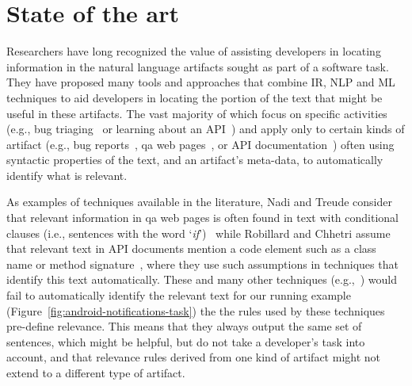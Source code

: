 \section{State of the art}
\label{cp1:novelty}


Researchers have long recognized the value of 
assisting developers in locating information in the natural language artifacts sought as part of a software task.
They have proposed many tools and approaches 
that combine \acf{IR}, \acf{NLP} and \acf{ML} techniques 
to aid developers in locating the portion of the text that
might be useful in these artifacts.
The vast majority of which focus on specific activities
(e.g., bug triaging~\cite{Chaparro2017} or learning about an API~\cite{Jiang2017}) and apply 
only to certain kinds of artifact 
(e.g., bug reports~\cite{Rastkar2010, Lotufo2012}, \acs{qa} web pages~\cite{Xu2017, silva2019}, or API documentation~\cite{fucci2019})
often using 
syntactic properties of the text, and an artifact's meta-data, to automatically identify what is relevant.



As examples of techniques available in the literature, Nadi and Treude consider 
that relevant information in \acs{qa} 
web pages is often found in text with
conditional clauses (i.e., sentences with the word `\textit{if}')~\cite{nadi2020}
while Robillard and Chhetri assume that relevant 
text in API documents mention a code element such as a class name or method signature~\cite{Robillard2015},
where they use such assumptions 
in techniques that identify this text automatically.
These and many other techniques (e.g.,~\cite{chaparro2019, fucci2019}) would fail to automatically identify the relevant text for our running example
(Figure~\ref{fig:android-notifications-task})
the the rules used by these techniques pre-define relevance.
This means that they always output the same set of sentences, 
which might be helpful, 
but do not take a developer's task into account, and that 
relevance rules derived from one kind of artifact
might not extend to a different type of artifact.




